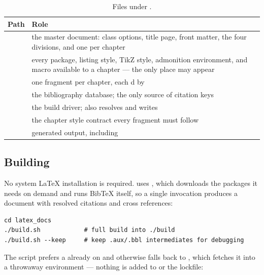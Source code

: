 \begin{table}[H]
  \centering
  \caption{Files under .}
  \label{tab:bd-latex-layout}
  \small
  \begin{tabularx}{\textwidth}{lL}
    \toprule
    Path & Role \\
    \midrule
        & the master document: class options, title page, front
      matter, the four  divisions, and one
       per chapter \\
     & every package, listing style, TikZ style, admonition
      environment, and macro available to a chapter --- the only place
       may appear \\
        & one  fragment per chapter, each
      d by  \\
         & the bibliography database; the only source of
      citation keys \\
         & the build driver; also resolves
       and writes  \\
         & the chapter style contract every fragment must follow \\
           & generated output, including  \\
    \bottomrule
  \end{tabularx}
\end{table}

\subsection{Building}

No system LaTeX installation is required.  uses ,
which downloads the packages it needs on demand and runs BibTeX itself, so a
single invocation produces a document with resolved citations and cross
references:

\begin{lstlisting}[language=shell]
cd latex_docs
./build.sh            # full build into ./build
./build.sh --keep     # keep .aux/.bbl intermediates for debugging
\end{lstlisting}

The script prefers a  already on  and otherwise falls
back to , which fetches it into a throwaway environment ---
nothing is added to  or the lockfile:

